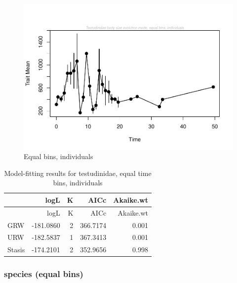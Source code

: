 \documentclass[]{article}
\begin{document}
\begin{figure}[htbp]
\centering
\includegraphics{MA_JJ_files/figure-latex/Play around with time bins, larger equal bins, individuals-1.pdf}
\caption{Equal bins, individuals}
\end{figure}

\begin{longtable}[]{@{}lrrrr@{}}
\caption{Model-fitting results for testudinidae, equal time bins,
individuals}\tabularnewline
\toprule
& logL & K & AICc & Akaike.wt\tabularnewline
\midrule
\endfirsthead
\toprule
& logL & K & AICc & Akaike.wt\tabularnewline
\midrule
\endhead
GRW & -181.0860 & 2 & 366.7174 & 0.001\tabularnewline
URW & -182.5837 & 1 & 367.3413 & 0.001\tabularnewline
Stasis & -174.2101 & 2 & 352.9656 & 0.998\tabularnewline
\bottomrule
\end{longtable}

\newpage

\subsubsection{species (equal bins)}\label{species-equal-bins}
\end{document}
